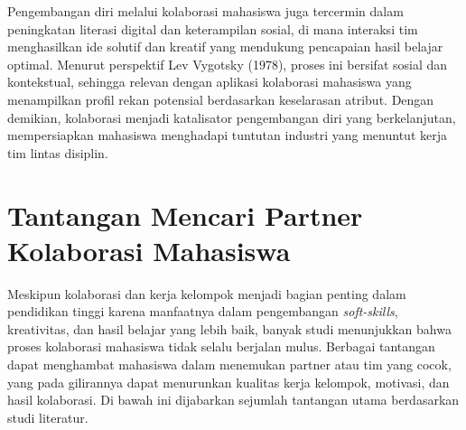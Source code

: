 Pengembangan diri melalui kolaborasi mahasiswa juga tercermin dalam peningkatan literasi digital dan keterampilan sosial, di mana interaksi tim menghasilkan ide solutif dan kreatif yang mendukung pencapaian hasil belajar optimal. Menurut perspektif Lev Vygotsky (1978), proses ini bersifat sosial dan kontekstual, sehingga relevan dengan aplikasi kolaborasi mahasiswa yang menampilkan profil rekan potensial berdasarkan keselarasan atribut. Dengan demikian, kolaborasi menjadi katalisator pengembangan diri yang berkelanjutan, mempersiapkan mahasiswa menghadapi tuntutan industri yang menuntut kerja tim lintas disiplin.

\section{Tantangan Mencari Partner Kolaborasi Mahasiswa}
Meskipun kolaborasi dan kerja kelompok menjadi bagian penting dalam pendidikan tinggi karena manfaatnya dalam pengembangan \textit{soft-skills}, kreativitas, dan hasil belajar yang lebih baik, banyak studi menunjukkan bahwa proses kolaborasi mahasiswa tidak selalu berjalan mulus. Berbagai tantangan dapat menghambat mahasiswa dalam menemukan partner atau tim yang cocok, yang pada gilirannya dapat menurunkan kualitas kerja kelompok, motivasi, dan hasil kolaborasi. Di bawah ini dijabarkan sejumlah tantangan utama berdasarkan studi literatur.
